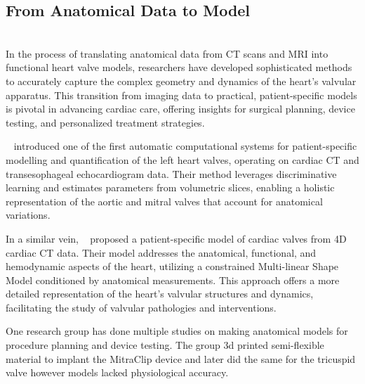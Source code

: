 

\subsection{From Anatomical Data to Model}
\\
In the process of translating anatomical data from \gls{CT} scans and \gls{MRI} into functional heart valve models, researchers have developed sophisticated methods to accurately capture the complex geometry and dynamics of the heart's valvular apparatus. This transition from imaging data to practical, patient-specific models is pivotal in advancing cardiac care, offering insights for surgical planning, device testing, and personalized treatment strategies.

~ introduced one of the first automatic computational systems for patient-specific modelling and quantification of the left heart valves, operating on cardiac \gls{CT} and transesophageal echocardiogram data. Their method leverages discriminative learning and estimates  parameters from volumetric slices, enabling a holistic representation of the aortic and mitral valves that account for anatomical variations.

In a similar vein, ~ proposed a patient-specific model of cardiac valves from 4D cardiac \gls{CT} data. Their model addresses the anatomical, functional, and hemodynamic aspects of the heart, utilizing a constrained Multi-linear Shape Model conditioned by anatomical measurements. This approach offers a more detailed representation of the heart's valvular structures and dynamics, facilitating the study of valvular pathologies and interventions.

One research group has done multiple studies on making anatomical models for procedure planning and device testing. The group 3d printed semi-flexible material to implant the MitraClip device and later did the same for the tricuspid valve  however models lacked physiological accuracy.

